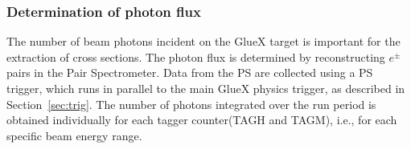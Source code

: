 %
%
%
%

\subsubsection{Determination of photon flux         \label{sec:ps_flux}}
The number of beam photons incident on 
the GlueX target is important for the extraction of cross sections. The photon flux is determined by reconstructing
$e^\pm$ pairs in the Pair Spectrometer. Data from the PS are 
collected using a PS trigger, which  runs in parallel to the 
main GlueX physics trigger, as described in Section~\ref{sec:trig}.
The number of photons integrated over the run period is obtained
individually for each tagger counter(TAGH and TAGM), i.e., for
each specific beam energy range. 

